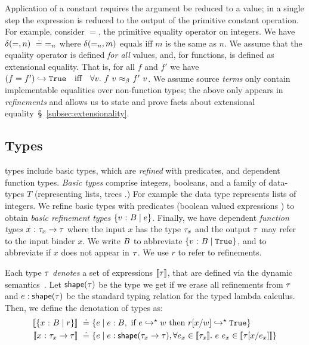  Application of a constant requires the
argument be reduced to a value; in a single step the
expression is reduced to the output of the primitive
constant operation.
%
For example, consider $=$, the primitive equality
operator on integers.
%
We have $\delta(=, n) \ \doteq\  =_n$
where $\delta(=_n, m)$ equals \etrue
iff $m$ is the same as $n$.
%
%
We assume that the equality operator
is defined \emph{for all} values,
and, for functions, is defined as
extensional equality.
%
That is, for all
$f$ and
$f'$
we have
${(f = f')}\hookrightarrow{\ensuremath{\texttt{True}}}
  \quad \mbox{iff} \quad
  \forall v.\ {f\ v}{\ \approx_{\beta}\ }{f'\ v}$.
%
We assume source \emph{terms} only contain implementable equalities
over non-function types; the above only appears in \emph{refinements}
and allows us to state and prove facts about extensional
equality~\S~\ref{subsec:extensionality}.



\subsection{Types}

\corelan types include basic types, which are \emph{refined} with predicates,
and dependent function types.
%
\emph{Basic types} \btyp comprise integers, booleans, and a family of data-types
$T$ (representing lists, trees \etc.)
%
For example the data type \tintlist represents lists of integers.
%
We refine basic types with predicates (boolean valued expressions ) to obtain
\emph{basic refinement types} $\{ {v} \ \text{:}\ {B} \mid e \}$.
%
Finally, we have dependent \emph{function types} ${x} \ \text{:}\ {\tau_x} \rightarrow \tau$
where the input $x$ has the type $\tau_x$ and the output $\tau$ may
refer to the input binder $x$.
%
We write $B$ to abbreviate $\{ {v} \ \text{:}\ {B} \mid \texttt{True} \}$,
and  to abbreviate  if
$x$ does not appear in $\tau$.
%
We use $r$ to refer to refinements.


%
Each type $\tau$ \emph{denotes} a set of expressions $[\![\tau]\!]$,
that are defined via the dynamic semantics~\cite{Knowles10}.
%
Let $\mathsf{shape}(\tau)$ be the type we get if we erase all refinements
from $\tau$ and $e : \mathsf{shape}(\tau)$ be the
standard typing relation for the typed lambda calculus.
%
Then, we define the denotation of types as:
\begin{align*}
\interp{\tref{x}{\btyp}{r}} \defeq &
    \{e \mid  \bhastype{}{e}{\btyp},
              \mbox{ if } \evalsto{e}{w}
              \mbox{ then } \evalsto{r\subst{x}{w}}{\etrue} \}\\
\interp{\tfun{x}{\typ_x}{\typ}} \defeq &
    \{e \mid  \bhastype{}{e}{\shape{\tfunbasic{\typ_x}{\typ}}},
              \forall e_x \in \interp{\typ_x}.\ \eapp{e}{e_x} \in \interp{\typ\subst{x}{e_x}}
    \}
\end{align*}


